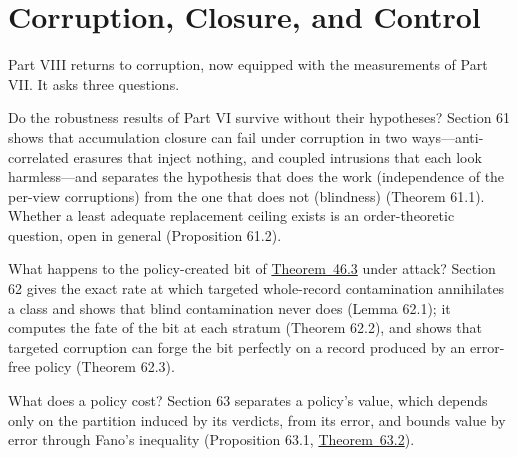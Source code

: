 \part{Corruption, Closure, and Control}


Part VIII returns to corruption, now equipped with the measurements of Part VII. It asks three questions.

Do the robustness results of Part VI survive without their hypotheses? Section 61 shows that accumulation closure can fail under corruption in two ways---\hspace{0pt}anti-correlated erasures that inject nothing, and coupled intrusions that each look harmless---\hspace{0pt}and separates the hypothesis that does the work (independence of the per-view corruptions) from the one that does not (blindness) (Theorem 61.1). Whether a least adequate replacement ceiling exists is an order-theoretic question, open in general (Proposition 61.2).

What happens to the policy-created bit of \hyperlink{stmt:46.3}{Theorem~46.3} under attack? Section 62 gives the exact rate at which targeted whole-record contamination annihilates a class and shows that blind contamination never does (Lemma 62.1); it computes the fate of the bit at each stratum (Theorem 62.2), and shows that targeted corruption can forge the bit perfectly on a record produced by an error-free policy (Theorem 62.3).

What does a policy cost? Section 63 separates a policy's value, which depends only on the partition induced by its verdicts, from its error, and bounds value by error through Fano's inequality (Proposition 63.1, \hyperlink{stmt:63.2}{Theorem~63.2}).



